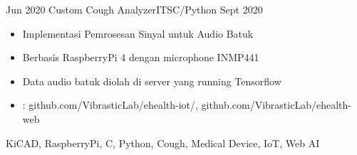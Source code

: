 \begin{experiences}
	\emptySeparator
	\experience
	{Jun 2020} {Custom Cough Analyzer}{ITS}{C/Python}
	{Sept 2020}    {
		\begin{itemize}
			\item Implementasi Pemrosesan Sinyal untuk Audio Batuk
			\item Berbasis RaspberryPi 4 dengan microphone INMP441
			\item Data audio batuk diolah di server yang running Tensorflow
			\item \faGithub:
			 {github.com/VibrasticLab/ehealth-iot/},
			 {github.com/VibrasticLab/ehealth-web}
		\end{itemize}
	}
	{KiCAD, RaspberryPi, C, Python, Cough, Medical Device, IoT, Web AI}


\end{experiences}
